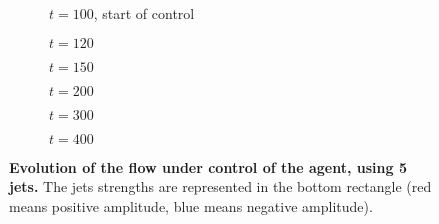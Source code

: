 \begin{figure}
\centering

\begin{subfigure}[t]{\textwidth}
	\centering
    	\caption{$t=100$, start of control}
	\label{fig:shkadov_fields_100}
\end{subfigure}

\medskip

\begin{subfigure}[t]{\textwidth}
	\centering
    	\caption{$t=120$}
	\label{fig:shkadov_fields_120}
\end{subfigure}

\medskip

\begin{subfigure}[t]{\textwidth}
	\centering
    	\caption{$t=150$}
	\label{fig:shkadov_fields_150}
\end{subfigure}

\medskip

\begin{subfigure}[t]{\textwidth}
	\centering
    	\caption{$t=200$}
	\label{fig:shkadov_fields_200}
\end{subfigure}

\medskip

\begin{subfigure}[t]{\textwidth}
	\centering
    	\caption{$t=300$}
	\label{fig:shkadov_fields_300}
\end{subfigure}

\medskip

\begin{subfigure}[t]{\textwidth}
	\centering
    	\caption{$t=400$}
	\label{fig:shkadov_fields_400}
\end{subfigure}
\caption{\textbf{Evolution of the flow under control of the agent, using 5 jets.} The jets strengths are represented in the bottom rectangle (red means positive amplitude, blue means negative amplitude).}
\label{fig:shkadov_fields}
\end{figure} 

